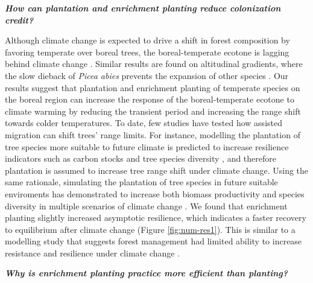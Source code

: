 \textbf{\emph{How can plantation and enrichment planting reduce
colonization credit?}}

Although climate change is expected to drive a shift in forest
composition by favoring temperate over boreal trees, the
boreal-temperate ecotone is lagging behind climate change
\citep{BoisvertMarsh2014, BoisvertMarsh2019, Talluto2017, Vissault2020}.
Similar results are found on altitudinal gradients, where the slow
dieback of \emph{Picea abies} prevents the expansion of other species
\citep{Scherrer2020}. Our results suggest that plantation and enrichment
planting of temperate species on the boreal region can increase the
response of the boreal-temperate ecotone to climate warming by reducing
the transient period and increasing the range shift towards colder
temperatures. To date, few studies have tested how assisted migration
can shift trees' range limits. For instance, modelling the plantation of
tree species more suitable to future climate is predicted to increase
resilience indicators such as carbon stocks and tree species diversity
\citep{Hof2017}, and therefore plantation is assumed to increase tree
range shift under climate change. Using the same rationale, simulating
the plantation of tree species in future suitable enviroments has
demonstrated to increase both biomass productivity and species diversity
in multiple scenarios of climate change \citep{Duveneck2015}. We found
that enrichment planting slightly increased asymptotic resilience, which
indicates a faster recovery to equilibrium after climate change (Figure
\ref{fig:num-res1}). This is similar to a modelling study that suggests
forest management had limited ability to increase resistance and
resilience under climate change \citep{Duveneck2016}.

\textbf{\emph{Why is enrichment planting practice more efficient than
planting?}}

